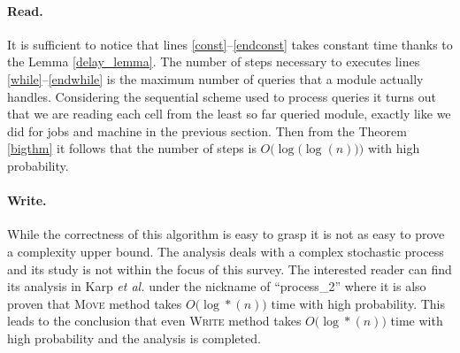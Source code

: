 \paragraph{{\bf Read}.} It is sufficient to notice that lines
\ref{const}--\ref{endconst} takes constant
time thanks to the Lemma \ref{delay_lemma}. The number of steps necessary to
executes lines \ref{while}--\ref{endwhile} is the maximum number of queries
that a module actually handles. Considering the sequential scheme used
to process queries it turns out that we are reading each cell from the
least so far queried module, exactly like we did for jobs and machine in the previous section. Then from the Theorem \ref{bigthm} it follows that the
number of steps is $O\bigl(\log\bigl(\log(n)\bigl)\bigl)$ with high probability.

\paragraph{{\bf Write}.} While the correctness of this algorithm is easy to
grasp it is not as easy to prove a complexity upper bound. The analysis deals
with a complex stochastic process and its study is not within the focus of this
survey. The interested reader can find its analysis in Karp {\em et al.}
\cite{Karp} under the nickname of ``process\_2'' where it is also proven that
\textsc{Move} method takes $O\bigl(\log*(n)\bigr)$ time with high probability.
This leads to the conclusion that even \textsc{Write} method takes
$O\bigl(\log*(n)\bigr)$ time with high probability and the analysis is
completed.








